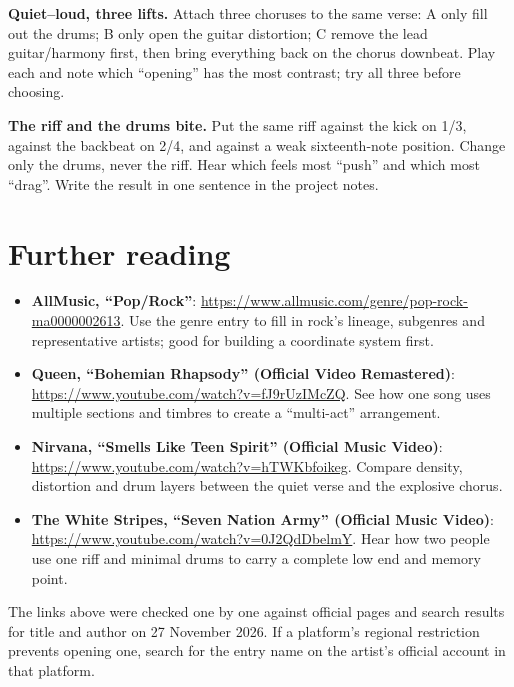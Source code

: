 \begin{exercise}
\textbf{Quiet--loud, three lifts.} Attach three choruses to the same verse: A only fill out the drums; B only open the guitar distortion; C remove the lead guitar/harmony first, then bring everything back on the chorus downbeat. Play each and note which ``opening'' has the most contrast; try all three before choosing.
\end{exercise}

\begin{exercise}
\textbf{The riff and the drums bite.} Put the same riff against the kick on 1/3, against the backbeat on 2/4, and against a weak sixteenth-note position. Change only the drums, never the riff. Hear which feels most ``push'' and which most ``drag''. Write the result in one sentence in the project notes.
\end{exercise}

\section{Further reading}
\label{sec:rock-reading}

\begin{sloppypar}
\begin{itemize}
\item \textbf{AllMusic, ``Pop/Rock''}: \url{https://www.allmusic.com/genre/pop-rock-ma0000002613}. Use the genre entry to fill in rock's lineage, subgenres and representative artists; good for building a coordinate system first.
\item \textbf{Queen, ``Bohemian Rhapsody'' (Official Video Remastered)}: \url{https://www.youtube.com/watch?v=fJ9rUzIMcZQ}. See how one song uses multiple sections and timbres to create a ``multi-act'' arrangement.
\item \textbf{Nirvana, ``Smells Like Teen Spirit'' (Official Music Video)}: \url{https://www.youtube.com/watch?v=hTWKbfoikeg}. Compare density, distortion and drum layers between the quiet verse and the explosive chorus.
\item \textbf{The White Stripes, ``Seven Nation Army'' (Official Music Video)}: \url{https://www.youtube.com/watch?v=0J2QdDbelmY}. Hear how two people use one riff and minimal drums to carry a complete low end and memory point.
\end{itemize}
\end{sloppypar}

The links above were checked one by one against official pages and search results for title and author on 27 November 2026. If a platform's regional restriction prevents opening one, search for the entry name on the artist's official account in that platform.

